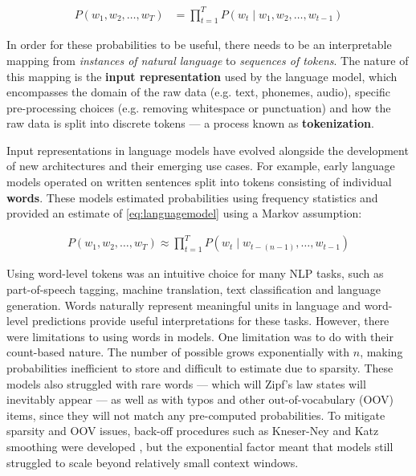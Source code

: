 \begin{align}
P(w_1, w_2, \dots, w_T) &= \prod_{t=1}^{T} P\left(w_t \mid w_1, w_2, \dots, w_{t-1} \right) \label{eq:languagemodel}
\end{align}

In order for these probabilities to be useful, there needs to be an interpretable mapping from \emph{instances of natural language} to \emph{sequences of tokens}. The nature of this mapping is the \textbf{input representation} used by the language model, which encompasses the domain of the raw data (e.g. text, phonemes, audio), specific pre-processing choices (e.g. removing whitespace or punctuation) and how the raw data is split into discrete tokens --- a process known as \textbf{tokenization}.

Input representations in language models have evolved alongside the development of new architectures and their emerging use cases. For example, early \ngram language models operated on written sentences split into tokens consisting of individual \textbf{words}. These models estimated probabilities using frequency statistics and provided an estimate of \cref{eq:languagemodel} using a Markov assumption:

\begin{align}
    P(w_1, w_2, \dots, w_T) \approx \prod_{t=1}^{T} P\left(w_t \mid w_{t-(n-1)}, \dots, w_{t-1}\right) \label{eq:ngram}
\end{align}

Using word-level tokens was an intuitive choice for many NLP tasks, such as part-of-speech tagging, machine translation, text classification and language generation. Words naturally represent meaningful units in language and word-level predictions provide useful interpretations for these tasks. However, there were limitations to using words in \ngram models. One limitation was to do with their count-based nature. The number of possible \ngrams grows exponentially with $n$, making probabilities inefficient to store and difficult to estimate due to sparsity. These models also struggled with rare words --- which will Zipf's law states will inevitably appear \citep{zipf_human_1949} --- as well as with typos and other out-of-vocabulary (OOV) items, since they will not match any pre-computed \ngram probabilities. To mitigate sparsity and OOV issues, back-off procedures such as Kneser-Ney and Katz smoothing were developed \citep{ney1994structuring, katz2003estimation}, but the exponential factor meant that \ngram models still struggled to scale beyond relatively small context windows.

